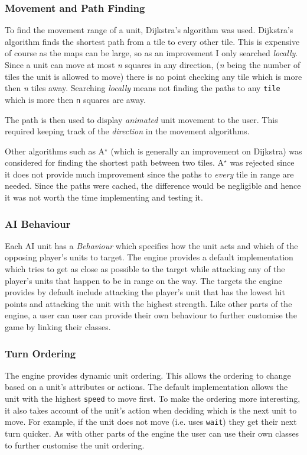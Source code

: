 \subsubsection{Movement and Path Finding}

To find the movement range of a unit, Dijkstra's algorithm was used. Dijkstra's algorithm finds the shortest path from a tile to every other tile. This is expensive of course as the maps can be large, so as an improvement I only searched \emph{locally}. Since a unit can move at most \emph{n} squares in any direction, (\emph{n} being the number of tiles the unit is allowed to move) there is no point checking any tile which is more then \emph{n} tiles away.  Searching \emph{locally} means not finding the paths to any \texttt{tile} which is more then \texttt{n} squares are away.

The path is then used to display \emph{animated} unit movement to the user.  This required keeping track of the \emph{direction} in the movement algorithms. 

\def\astar{A$^{\star}$ }

Other algorithms such as \astar (which is generally an improvement on Dijkstra) was considered for finding the shortest path between two tiles. \astar was rejected since it does not provide much improvement since the paths to \emph{every} tile in range are needed. Since the paths were cached, the difference would be negligible and hence it was not worth the time implementing and testing it.

\subsubsection{AI Behaviour}
Each AI unit has a \emph{Behaviour} which specifies how the unit acts and which of the opposing player's units to target.  The engine provides a default implementation which tries to get as close as possible to the target while attacking any of the player's units that happen to be in range on the way.  The targets the engine provides by default include attacking the player's unit that has the lowest hit points and attacking the unit with the highest strength. Like other parts of the engine, a user can user can provide their own behaviour to further customise the game by linking their classes.

\subsubsection{Turn Ordering}
The engine provides dynamic unit ordering.  This allows the ordering to change based on a unit's attributes or actions.  The default implementation allows the unit with the highest \texttt{speed} to move first.  To make the ordering more interesting, it also takes account of the unit's action when deciding which is the next unit to move. For example, if the unit does not move (i.e. uses \texttt{wait}) they get their next turn quicker. As with other parts of the engine the user can use their own classes to further customise the unit ordering.

